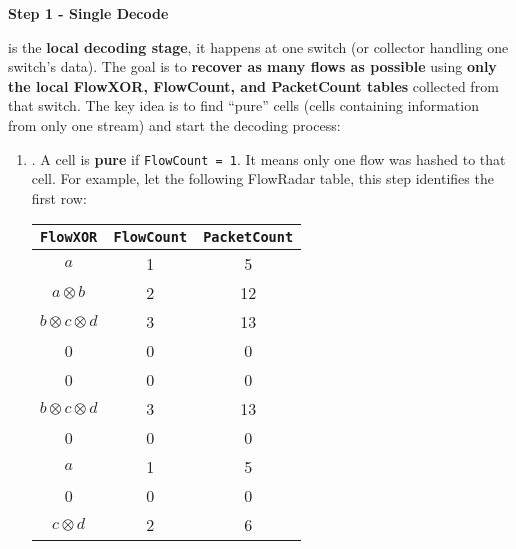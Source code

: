 \highspace
\begin{flushleft}
    \textcolor{Green3}{ \textbf{Step 1 - Single Decode}}
\end{flushleft}
 is the \textbf{local decoding stage}, it happens at one switch (or collector handling one switch's data). The goal is to \textbf{recover as many flows as possible} using \textbf{only the local FlowXOR, FlowCount, and PacketCount tables} collected from that switch. The key idea is to find ``pure'' cells (cells containing information from only one stream) and start the decoding process:
\begin{enumerate}
    \item {}. A cell is \textbf{pure} if \texttt{FlowCount = 1}. It means only one flow was hashed to that cell. For example, let the following FlowRadar table, this step identifies the first row:
    \begin{table}[!htp]
        \centering
        \begin{tabular}{@{} c | c | c @{}}
            \toprule
            \texttt{FlowXOR} & \texttt{FlowCount} & \texttt{PacketCount} \\
            \midrule
            $a$ & 1 & 5 \\
            $a \otimes b$ & 2 & 12 \\
            $b \otimes c \otimes d$ & 3 & 13 \\
            0 & 0 & 0 \\
            0 & 0 & 0 \\
            $b \otimes c \otimes d$ & 3 & 13 \\
            0 & 0 & 0 \\
            $a$ & 1 & 5 \\
            0 & 0 & 0 \\
            $c \otimes d$ & 2 & 6 \\
            \bottomrule
        \end{tabular}
    \end{table}

    
    \newpage



\end{enumerate}
